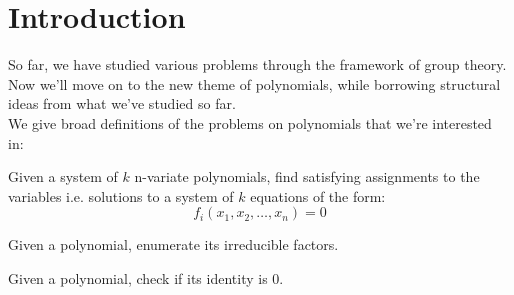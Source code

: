 
\section{Introduction}
So far, we have studied various problems through the framework of group theory. Now we'll move on to the new theme of polynomials, while borrowing structural ideas from what we've studied so far.\\
We give broad definitions of the problems on polynomials that we're interested in:\\

\begin{problem}
Given a system of $k$ n-variate polynomials, find satisfying assignments to the variables i.e. solutions to a system of $k$ equations of the form:
\begin{equation}
	\label{polynomial_equation}
f_i (x_1, x_2, \ldots, x_n) = 0
\end{equation}
\end{problem}

\begin{problem}
Given a polynomial, enumerate its irreducible factors.
\end{problem}

\begin{problem}
Given a polynomial, check if its identity is 0.
\end{problem}


